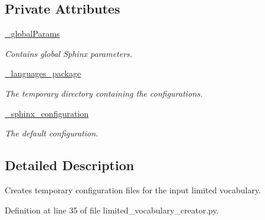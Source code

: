 \subsection*{Private Attributes}
\begin{DoxyCompactItemize}
\item 
\hyperlink{classrapp__speech__detection__sphinx4_1_1limited__vocabulary__creator_1_1LimitedVocabularyCreator_aed3371150a1a9bf3a2c08b2d723b9b6d}{\-\_\-global\-Params}
\begin{DoxyCompactList}\small\item\em Contains global Sphinx parameters. \end{DoxyCompactList}\item 
\hyperlink{classrapp__speech__detection__sphinx4_1_1limited__vocabulary__creator_1_1LimitedVocabularyCreator_ae1b8d5800533017114debb9af3b3f8bf}{\-\_\-languages\-\_\-package}
\begin{DoxyCompactList}\small\item\em The temporary directory containing the configurations. \end{DoxyCompactList}\item 
\hyperlink{classrapp__speech__detection__sphinx4_1_1limited__vocabulary__creator_1_1LimitedVocabularyCreator_a314b210f269c8fad2cc6ff57d03f6db4}{\-\_\-sphinx\-\_\-configuration}
\begin{DoxyCompactList}\small\item\em The default configuration. \end{DoxyCompactList}\end{DoxyCompactItemize}


\subsection{Detailed Description}
Creates temporary configuration files for the input limited vocabulary. 

Definition at line 35 of file limited\-\_\-vocabulary\-\_\-creator.\-py.



